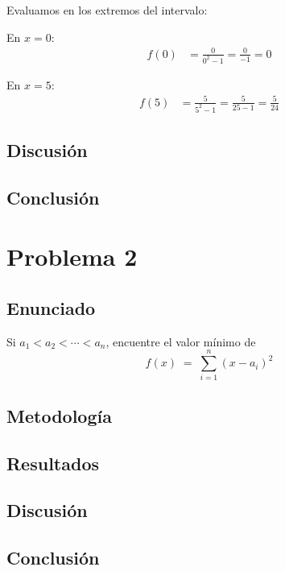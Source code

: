\documentclass{article}
\begin{document}
Evaluamos en los extremos del intervalo:

En $x = 0$:
\begin{align}
f(0) &= \frac{0}{0^{2} - 1} = \frac{0}{-1} = 0
\end{align}

En $x = 5$:
\begin{align}
f(5) &= \frac{5}{5^{2} - 1} = \frac{5}{25 - 1} = \frac{5}{24}
\end{align}

\subsection{Discusión}

\subsection{Conclusión}

\section{Problema 2}

\subsection{Enunciado}
Si $a_{1} < a_{2} < \cdots < a_{n}$, encuentre el valor mínimo de
\[
f(x) \;=\; \sum_{i=1}^{n} (x - a_i)^2
\]

\subsection{Metodología}

\subsection{Resultados}
\setcounter{equation}{0}

\subsection{Discusión}

\subsection{Conclusión}

\end{document}

